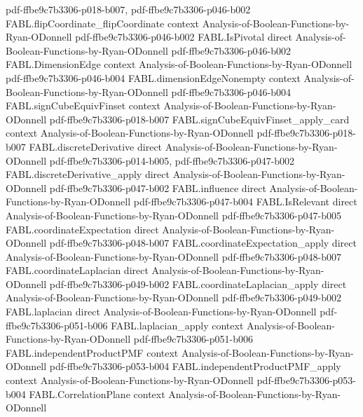 \begin{theorem}
  {pdf-ffbe9c7b3306-p018-b007,
    pdf-ffbe9c7b3306-p046-b002}
\proofstep
  {FABL.flipCoordinate_flipCoordinate}
  {context}
  {Analysis-of-Boolean-Functions-by-Ryan-ODonnell}
  {pdf-ffbe9c7b3306-p046-b002}
\proofstep
  {FABL.IsPivotal}
  {direct}
  {Analysis-of-Boolean-Functions-by-Ryan-ODonnell}
  {pdf-ffbe9c7b3306-p046-b002}
\proofstep
  {FABL.DimensionEdge}
  {context}
  {Analysis-of-Boolean-Functions-by-Ryan-ODonnell}
  {pdf-ffbe9c7b3306-p046-b004}
\proofstep
  {FABL.dimensionEdgeNonempty}
  {context}
  {Analysis-of-Boolean-Functions-by-Ryan-ODonnell}
  {pdf-ffbe9c7b3306-p046-b004}
\proofstep
  {FABL.signCubeEquivFinset}
  {context}
  {Analysis-of-Boolean-Functions-by-Ryan-ODonnell}
  {pdf-ffbe9c7b3306-p018-b007}
\proofstep
  {FABL.signCubeEquivFinset_apply_card}
  {context}
  {Analysis-of-Boolean-Functions-by-Ryan-ODonnell}
  {pdf-ffbe9c7b3306-p018-b007}
\proofstep
  {FABL.discreteDerivative}
  {direct}
  {Analysis-of-Boolean-Functions-by-Ryan-ODonnell}
  {pdf-ffbe9c7b3306-p014-b005,
    pdf-ffbe9c7b3306-p047-b002}
\proofstep
  {FABL.discreteDerivative_apply}
  {direct}
  {Analysis-of-Boolean-Functions-by-Ryan-ODonnell}
  {pdf-ffbe9c7b3306-p047-b002}
\proofstep
  {FABL.influence}
  {direct}
  {Analysis-of-Boolean-Functions-by-Ryan-ODonnell}
  {pdf-ffbe9c7b3306-p047-b004}
\proofstep
  {FABL.IsRelevant}
  {direct}
  {Analysis-of-Boolean-Functions-by-Ryan-ODonnell}
  {pdf-ffbe9c7b3306-p047-b005}
\proofstep
  {FABL.coordinateExpectation}
  {direct}
  {Analysis-of-Boolean-Functions-by-Ryan-ODonnell}
  {pdf-ffbe9c7b3306-p048-b007}
\proofstep
  {FABL.coordinateExpectation_apply}
  {direct}
  {Analysis-of-Boolean-Functions-by-Ryan-ODonnell}
  {pdf-ffbe9c7b3306-p048-b007}
\proofstep
  {FABL.coordinateLaplacian}
  {direct}
  {Analysis-of-Boolean-Functions-by-Ryan-ODonnell}
  {pdf-ffbe9c7b3306-p049-b002}
\proofstep
  {FABL.coordinateLaplacian_apply}
  {direct}
  {Analysis-of-Boolean-Functions-by-Ryan-ODonnell}
  {pdf-ffbe9c7b3306-p049-b002}
\proofstep
  {FABL.laplacian}
  {direct}
  {Analysis-of-Boolean-Functions-by-Ryan-ODonnell}
  {pdf-ffbe9c7b3306-p051-b006}
\proofstep
  {FABL.laplacian_apply}
  {context}
  {Analysis-of-Boolean-Functions-by-Ryan-ODonnell}
  {pdf-ffbe9c7b3306-p051-b006}
\proofstep
  {FABL.independentProductPMF}
  {context}
  {Analysis-of-Boolean-Functions-by-Ryan-ODonnell}
  {pdf-ffbe9c7b3306-p053-b004}
\proofstep
  {FABL.independentProductPMF_apply}
  {context}
  {Analysis-of-Boolean-Functions-by-Ryan-ODonnell}
  {pdf-ffbe9c7b3306-p053-b004}
\proofstep
  {FABL.CorrelationPlane}
  {context}
  {Analysis-of-Boolean-Functions-by-Ryan-ODonnell}

\end{theorem}
